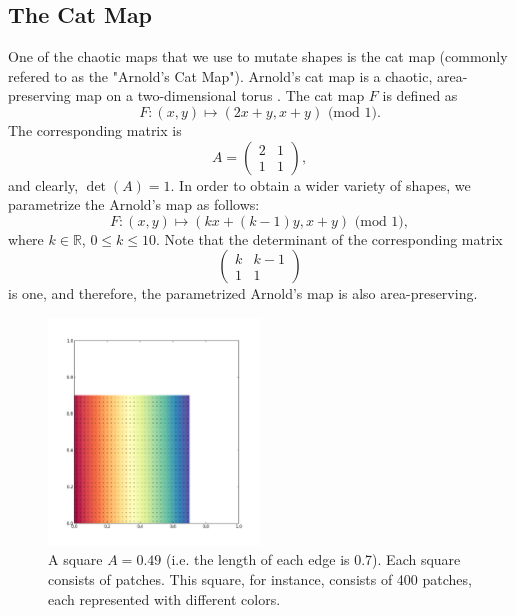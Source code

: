 \documentclass[12pt]{reedmcm}
\begin{document}
\subsection{The Cat Map}
One of the chaotic maps that we use to mutate shapes is the cat map (commonly refered to as the "Arnold's Cat Map").
Arnold's cat map is a chaotic, area-preserving map on a two-dimensional torus \citep{hilborn}.
The cat map $F$ is defined as
\begin{equation*}
  F: (x,y) \mapsto (2x + y, x + y) \mbox{ (mod 1)}.
\end{equation*}
The corresponding matrix is
\begin{equation*}
A =
\begin{pmatrix}
    2 & 1  \\
    1 & 1  
  \end{pmatrix},
\end{equation*}
and clearly, $\det(A) = 1$.
In order to obtain a wider variety of shapes, we parametrize the Arnold's map as follows:
\begin{equation*}
  F: (x,y) \mapsto (kx + (k-1)y, x + y) \mbox{ (mod 1)},
\end{equation*}
where $k \in \mathbb{R}$, $0 \leq k \leq 10$.
Note that the determinant of the corresponding matrix
\begin{equation*}
\begin{pmatrix}
    k & k-1  \\
    1 & 1  
  \end{pmatrix}
\end{equation*}
is one, and therefore, the parametrized Arnold's map is also area-preserving.
\begin{figure}[p]
  \centering
  \includegraphics[width=0.5\textwidth]{square_049_900}
  \caption{A square $A = 0.49$ (i.e. the length of each edge is 0.7). Each square consists of patches. This square, for instance, consists of 400 patches, each represented with different colors.}
  \label{fig:square}
\end{figure}
\end{document}
